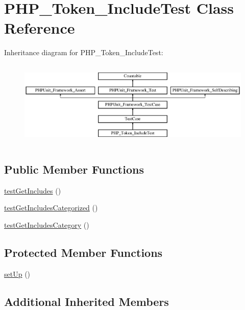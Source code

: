 \hypertarget{class_p_h_p___token___include_test}{}\section{P\+H\+P\+\_\+\+Token\+\_\+\+Include\+Test Class Reference}
\label{class_p_h_p___token___include_test}
Inheritance diagram for P\+H\+P\+\_\+\+Token\+\_\+\+Include\+Test\+:\begin{figure}[H]
\begin{center}
\leavevmode
\includegraphics[height=4.129793cm]{class_p_h_p___token___include_test}
\end{center}
\end{figure}
\subsection*{Public Member Functions}
\begin{DoxyCompactItemize}
\item 
\mbox{\hyperlink{class_p_h_p___token___include_test_a035de40f58646f326f7c5dee5d7bda7a}{test\+Get\+Includes}} ()
\item 
\mbox{\hyperlink{class_p_h_p___token___include_test_aebf4710d8670b5d870b48793fedfa951}{test\+Get\+Includes\+Categorized}} ()
\item 
\mbox{\hyperlink{class_p_h_p___token___include_test_acb5ed0ed19720fc0cf6f4880f6250276}{test\+Get\+Includes\+Category}} ()
\end{DoxyCompactItemize}
\subsection*{Protected Member Functions}
\begin{DoxyCompactItemize}
\item 
\mbox{\hyperlink{class_p_h_p___token___include_test_a0bc688732d2b3b162ffebaf7812e78da}{set\+Up}} ()
\end{DoxyCompactItemize}
\subsection*{Additional Inherited Members}


